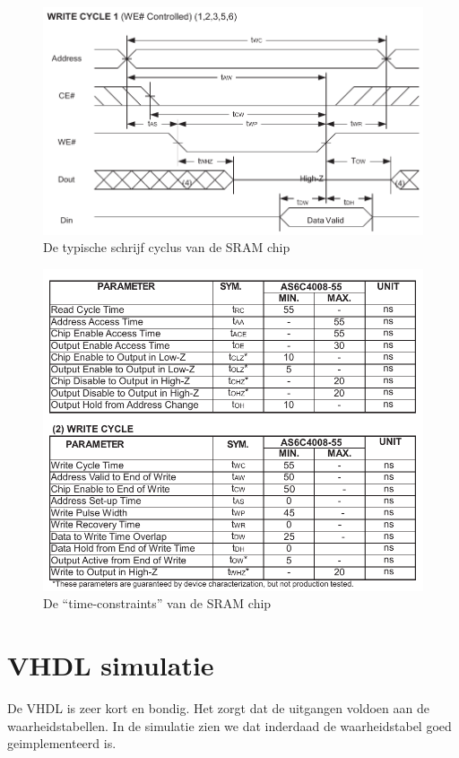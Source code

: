 \documentclass{scrreprt} %
\begin{document}
\begin{figure}[H]
\centering
	\includegraphics[width=\textwidth]{resources/write_cycle-rc.pdf}
	\caption{De typische schrijf cyclus van de SRAM chip \cite{ram-datasheet}}
	\label{fig:ramcontroller-write-cycle}
\end{figure}

\begin{figure}[H]
\centering
	\includegraphics[width=\textwidth]{resources/time_constraints-rc.pdf}
	\caption{De “time-constraints” van de SRAM chip \cite{ram-datasheet}}
	\label{fig:ramcontroller-time-constraints}
\end{figure}

\section{VHDL simulatie}
De VHDL is zeer kort en bondig. Het zorgt dat de uitgangen voldoen aan de waarheidstabellen.
In de simulatie zien we dat inderdaad de waarheidstabel goed geimplementeerd is.
\end{document}
